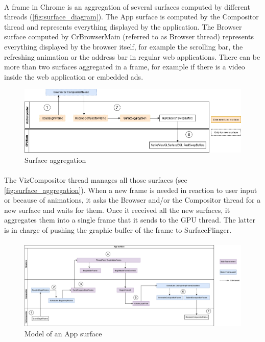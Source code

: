\documentclass{kththesis}
\begin{document}
\paragraph{}
A frame in Chrome is an aggregation of several surfaces computed by different threads (\autoref{fig:surface_diagram}). The App surface is computed by the Compositor thread and represents everything displayed by the application. The Browser surface computed by CrBrowserMain (referred to as Browser thread) represents everything displayed by the browser itself, for example the scrolling bar, the refreshing animation or the address bar in regular web applications. There can be more than two surfaces aggregated in a frame, for example if there is a video inside the web application or embedded ads.

\begin{figure}[h]
    \centering
    \includegraphics[width=\linewidth]{kththesis/Figures/Surface_aggregation.png}
    \caption{Surface aggregation}
    \label{fig:surface_aggregation}
\end{figure}

\paragraph{}
The VizCompositor thread manages all those surfaces (see \autoref{fig:surface_aggregation}). When a new frame is needed in reaction to user input or because of animations, it asks the Browser and/or the Compositor thread for a new surface and waits for them. Once it received all the new surfaces, it aggregates them into a single frame that it sends to the GPU thread. The latter is in charge of pushing the graphic buffer of the frame to SurfaceFlinger. 

\paragraph{}

\begin{figure}
    \centering
    \includegraphics[width=\linewidth]{kththesis/Figures/App_surface.png}
    \caption{Model of an App surface}
    \label{fig:app_surface}
\end{figure}
\end{document}
